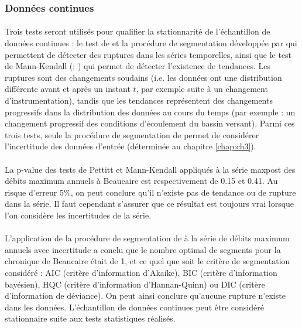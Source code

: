 	\subsubsection{Données continues}
	
	\paragraph{} Trois tests seront utilisés pour qualifier la stationnarité de l'échantillon de données continues : le test de \citet{pettitt_non-parametric_1979} et la procédure de segmentation développée par \citet{darienzo_detection_2021-1} qui permettent de détecter des ruptures dans les séries temporelles, ainsi que le test de Mann-Kendall (\cite{mann_nonparametric_1945}; \cite{kendall_rank_1948}) qui permet de détecter l'existence de tendances. Les ruptures sont des changements soudains (i.e. les données ont une distribution différente avant et après un instant $t$, par exemple suite à un changement d'instrumentation), tandis que les tendances représentent des changements progressifs dans la distribution des données au cours du temps (par exemple : un changement progressif des conditions d'écoulement du bassin versant). Parmi ces trois tests, seule la procédure de segmentation de \citet{darienzo_detection_2021-1} permet de considérer l'incertitude des données d'entrée (déterminée au chapitre \ref{chap:ch3}).
	
	\paragraph{} La p-value des tests de Pettitt et Mann-Kendall appliqués à la série maxpost des débits maximum annuels à Beaucaire est respectivement de 0.15 et 0.41. Au risque d'erreur 5\%, on peut conclure qu'il n'existe pas de tendance ou de rupture dans la série. Il faut cependant s'assurer que ce résultat est toujours vrai lorsque l'on considère les incertitudes de la série.
			
	\paragraph{} L'application de la procédure de segmentation de \citet{darienzo_detection_2021-1} à la série de débits maximum annuels avec incertitude a conclu que le nombre optimal de segments pour la chronique de Beaucaire était de 1, et ce quel que soit le critère de segmentation considéré : AIC (critère d'information d'Akaike), BIC (critère d'information bayésien), HQC (critère d'information d'Hannan-Quinn) ou DIC (critère d'information de déviance). On peut ainsi conclure qu'aucune rupture n'existe dans les données. L'échantillon de données continues peut être considéré stationnaire suite aux tests statistiques réalisés. 
	
